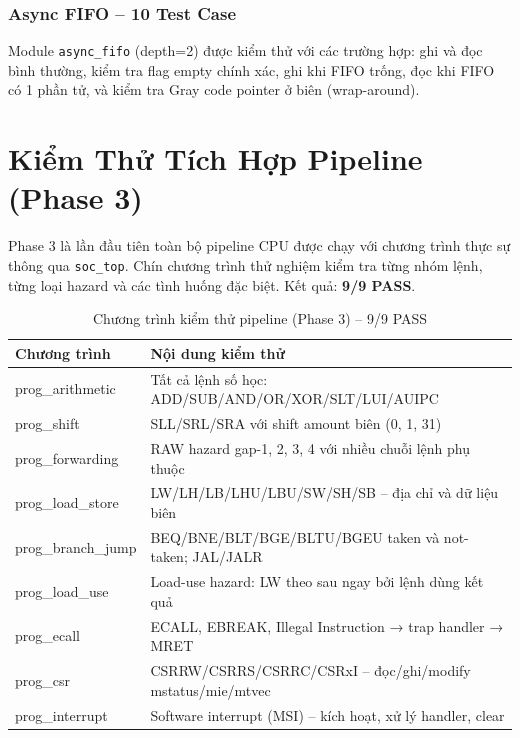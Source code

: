 \subsubsection{Async FIFO -- 10 Test Case}

Module \texttt{async\_fifo} (depth=2) được kiểm thử với các trường hợp: ghi và đọc bình thường, kiểm tra flag empty chính xác, ghi khi FIFO trống, đọc khi FIFO có 1 phần tử, và kiểm tra Gray code pointer ở biên (wrap-around).

\section{Kiểm Thử Tích Hợp Pipeline (Phase 3)}

Phase 3 là lần đầu tiên toàn bộ pipeline CPU được chạy với chương trình thực sự thông qua \texttt{soc\_top}. Chín chương trình thử nghiệm kiểm tra từng nhóm lệnh, từng loại hazard và các tình huống đặc biệt. Kết quả: \textbf{9/9 PASS}.

\begin{table}[htbp]
\caption{Chương trình kiểm thử pipeline (Phase 3) -- 9/9 PASS}
\label{tab:phase3-programs}
\begin{center}
\begin{tabular}{|l|l|}
\hline
\textbf{Chương trình} & \textbf{Nội dung kiểm thử} \\ \hline
prog\_arithmetic & Tất cả lệnh số học: ADD/SUB/AND/OR/XOR/SLT/LUI/AUIPC \\ \hline
prog\_shift & SLL/SRL/SRA với shift amount biên (0, 1, 31) \\ \hline
prog\_forwarding & RAW hazard gap-1, 2, 3, 4 với nhiều chuỗi lệnh phụ thuộc \\ \hline
prog\_load\_store & LW/LH/LB/LHU/LBU/SW/SH/SB -- địa chỉ và dữ liệu biên \\ \hline
prog\_branch\_jump & BEQ/BNE/BLT/BGE/BLTU/BGEU taken và not-taken; JAL/JALR \\ \hline
prog\_load\_use & Load-use hazard: LW theo sau ngay bởi lệnh dùng kết quả \\ \hline
prog\_ecall & ECALL, EBREAK, Illegal Instruction → trap handler → MRET \\ \hline
prog\_csr & CSRRW/CSRRS/CSRRC/CSRxI -- đọc/ghi/modify mstatus/mie/mtvec \\ \hline
prog\_interrupt & Software interrupt (MSI) -- kích hoạt, xử lý handler, clear \\ \hline
\end{tabular}
\end{center}
\end{table}

